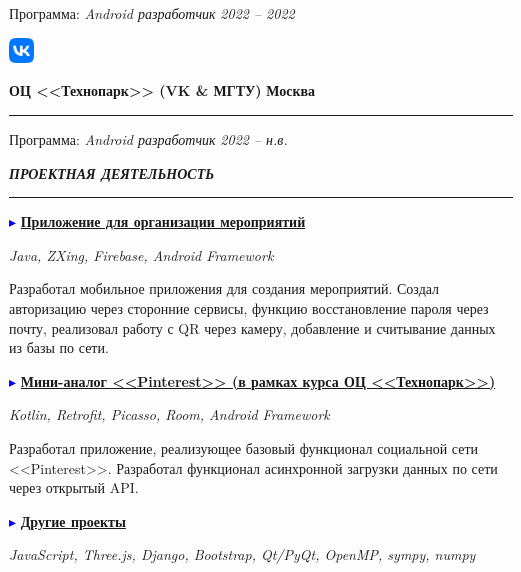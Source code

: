 \documentclass[a4paper, 10pt]{extarticle}
\newcommand{\Sep}{
    \noindent\hdashrule[0.5ex]{\columnwidth}{1pt}{1mm 1pt}
}
\begin{document}
\begin{paracol}{2}
\begin{rightcolumn}
{                Программа: \textit{Android разработчик}
                \hfill \textit{2022 -- 2022} 
            }
            \vspace{1em}

            \noindent\parbox{0.1\columnwidth}{
                \includegraphics[width=0.05\textwidth]{img/vk_logo.png}
            }
            \parbox{0.89\columnwidth}{
                \textbf{ОЦ <<Технопарк>> (VK \& МГТУ)}
                \hfill \textbf{Москва}
                \hrule
                \vspace{0.5em}

                Программа: \textit{Android разработчик}
                \hfill \textit{2022 -- н.в.} 
            }
            \vspace{-1.1em}

            \Sep
            \begin{center}
                \textbf{\textit{ПРОЕКТНАЯ ДЕЯТЕЛЬНОСТЬ}}
                \vspace{-1.25em}

                \rule{5em}{1pt}
            \end{center}
            \vspace{-1em}
            \textcolor{blue}{$\blacktriangleright$} 
            \textbf{\underline{Приложение для организации мероприятий}}
            
            \noindent\textit{Java, ZXing, Firebase, Android Framework}
            
            \noindent Разработал мобильное приложения для создания мероприятий.
            Создал авторизацию через сторонние сервисы, функцию восстановление пароля через почту,
            реализовал работу с QR через камеру, добавление и считывание данных из базы по сети.
            
            \noindent\textcolor{blue}{$\blacktriangleright$} 
            \textbf{\underline{Мини-аналог <<Pinterest>> (в рамках курса ОЦ <<Технопарк>>)}}
            
            \noindent\textit{Kotlin, Retrofit, Picasso, Room, Android Framework}
            
            \noindent Разработал приложение, реализующее базовый функционал социальной сети <<Pinterest>>.
            Разработал функционал асинхронной загрузки данных по сети через открытый API.

            \noindent\textcolor{blue}{$\blacktriangleright$}
            \noindent\textbf{\underline{Другие проекты}}

            \noindent\textit{JavaScript, Three.js, Django, Bootstrap, Qt/PyQt, OpenMP, sympy, numpy}
        \end{rightcolumn}
    \end{paracol}
\end{document}
